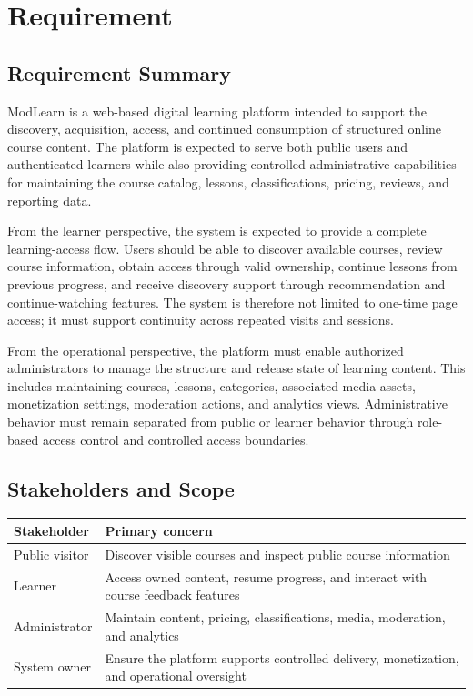 \section{Requirement}

\subsection{Requirement Summary}

ModLearn is a web-based digital learning platform intended to support the discovery, acquisition, access, and continued consumption of structured online course content. The platform is expected to serve both public users and authenticated learners while also providing controlled administrative capabilities for maintaining the course catalog, lessons, classifications, pricing, reviews, and reporting data.

From the learner perspective, the system is expected to provide a complete learning-access flow. Users should be able to discover available courses, review course information, obtain access through valid ownership, continue lessons from previous progress, and receive discovery support through recommendation and continue-watching features. The system is therefore not limited to one-time page access; it must support continuity across repeated visits and sessions.

From the operational perspective, the platform must enable authorized administrators to manage the structure and release state of learning content. This includes maintaining courses, lessons, categories, associated media assets, monetization settings, moderation actions, and analytics views. Administrative behavior must remain separated from public or learner behavior through role-based access control and controlled access boundaries.

\subsection{Stakeholders and Scope}

\begin{tabularx}{\textwidth}{L{3cm}Y}
\toprule
\textbf{Stakeholder} & \textbf{Primary concern} \\
\midrule
Public visitor & Discover visible courses and inspect public course information \\
Learner & Access owned content, resume progress, and interact with course feedback features \\
Administrator & Maintain content, pricing, classifications, media, moderation, and analytics \\
System owner & Ensure the platform supports controlled delivery, monetization, and operational oversight \\
\bottomrule
\end{tabularx}
